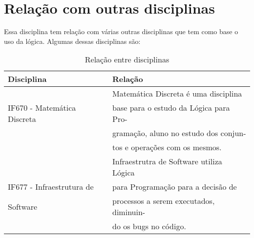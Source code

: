 \documentclass[10pt]{article}
\begin{document}
\section{Relação com outras disciplinas}
Essa disciplina tem relação com várias outras disciplinas que tem como base o uso da lógica. Algumas dessas disciplinas são:
\begin{table}[h]
    \centering
    \begin{tabular}{|l|l|}
    \hline    Disciplina & Relação \\
    \hline     & Matemática Discreta é uma disciplina  \\
         IF670 - Matemática Discreta & base para o estudo da Lógica para Pro-\\
          & gramação,  aluno no estudo dos conjun-\\
          &tos  e operações com os mesmos.\citep{site5}\\
    \hline & Infraestrutra de Software utiliza Lógica \\
      IF677 -  Infraestrutura de  & para Programação para a decisão de\\
      Software  &  processos a serem executados, diminuin-\\
        & do os bugs no código.\citep{site6}\\
    \hline
    \end{tabular}
    \caption{Relação entre disciplinas \citep{site2} \citep{site3}}
    \label{tab:my_label}
\end{table}



\end{document}

